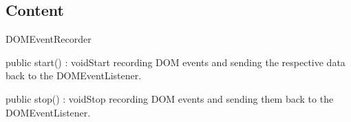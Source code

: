 \subsection{Content}
\begin{class}{DOMEventRecorder}




\begin{methods}
\begin{method}{public start() : void}{Start recording DOM events and sending the respective data back to the DOMEventListener.}
\end{method}
\begin{method}{public stop() : void}{Stop recording DOM events and sending them back to the DOMEventListener.}
\end{method}
\end{methods}
\end{class}